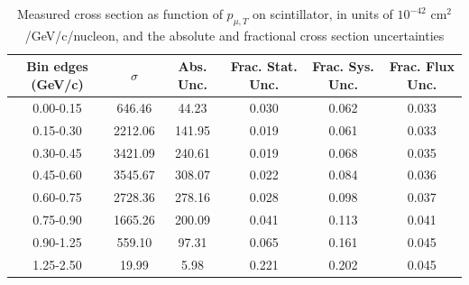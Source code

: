 \documentclass[../main.tex]{subfiles}
\begin{document}
\begin{table}
  \centering
  \renewcommand{\arraystretch}{1.15}
  \caption{Systematic covariance matrix of measured cross section in $p_{\mu,||}$ on scintillator, in units of $10^{-84}$ $(\text{cm}^2$/GeV/c/nucleon$)^2$}
  \label{tbl:sysnucleonplasticmuon_pzc}
\end{table}
\pagebreak
\begin{turnpage}
\end{turnpage}
\begin{table}
  \centering
  \renewcommand{\arraystretch}{1.15}
  \caption{Measured cross section as function of $p_{\mu,T}$ on scintillator, in units of $10^{-42}$ $\text{cm}^2$/GeV/c/nucleon, and the absolute and fractional cross section uncertainties}
    \begin{tabular}{c||c|c||c|c|c}
      Bin edges (GeV/c) &  $\sigma$  &  Abs. Unc.  &  Frac. Stat. Unc.  &  Frac. Sys. Unc.  &  Frac. Flux Unc. \\
      \hline
      \hline
      0.00-0.15 & 646.46 & 44.23 & 0.030 & 0.062 & 0.033\\
      0.15-0.30 & 2212.06 & 141.95 & 0.019 & 0.061 & 0.033\\
      0.30-0.45 & 3421.09 & 240.61 & 0.019 & 0.068 & 0.035\\
      0.45-0.60 & 3545.67 & 308.07 & 0.022 & 0.084 & 0.036\\
      0.60-0.75 & 2728.36 & 278.16 & 0.028 & 0.098 & 0.037\\
      0.75-0.90 & 1665.26 & 200.09 & 0.041 & 0.113 & 0.041\\
      0.90-1.25 & 559.10 & 97.31 & 0.065 & 0.161 & 0.045\\
      1.25-2.50 & 19.99 & 5.98 & 0.221 & 0.202 & 0.045
    \end{tabular}
  \label{tbl:datanucleonplasticmuon_pta}
\end{table}
\end{document}
